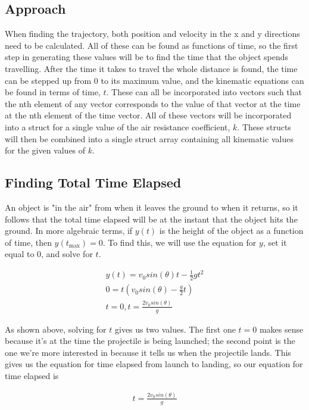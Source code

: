 \documentclass[oneside]{article}
\begin{document}
\subsection{Approach}
When finding the trajectory, both position and velocity in the x and y directions need to be calculated. All of these can be found as functions of time, so the first step in generating these values will be to find the time that the object spends travelling. After the time it takes to travel the whole distance is found, the time can be stepped up from 0 to its maximum value, and the kinematic equations can be found in terms of time, $t$. These can all be incorporated into vectors such that the nth element of any vector corresponds to the value of that vector at the time at the nth element of the time vector. All of these vectors will be incorporated into a struct for a single value of the air resistance coefficient, $k$. These structs will then be combined into a single struct array containing all kinematic values for the given values of $k$.

\subsection{Finding Total Time Elapsed}
An object is "in the air" from when it leaves the ground to when it returns, so it follows that the total time elapsed will be at the instant that the object hits the ground. In more algebraic terms, if $y(t)$ is the height of the object as a function of time, then $y(t_\textrm{max}) = 0$. To find this, we will use the equation for $y$, set it equal to 0, and solve for $t$.

\begin{align*}
    y(t) = v_0sin(\theta)t - \frac{1}{2}gt^2\\
    0 = t(v_0sin(\theta) - \frac{g}{2}t)\\
    t = 0, t = \frac{2v_0sin(\theta)}{g}
\end{align*}

As shown above, solving for $t$ gives us two values. The first one $t=0$ makes sense because it's at the time the projectile is being launched; the second point is the one we're more interested in because it tells us when the projectile lands. This gives us the equation for time elapsed from launch to landing, so our equation for time elapsed is 

\begin{align}
    t = \frac{2v_0sin(\theta)}{g}
\end{align}
\end{document}
